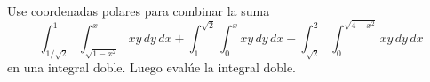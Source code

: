 \item Use coordenadas polares para combinar la suma
\[ \int_{1/\sqrt{2}}^1 \int_{\sqrt{1-x^2}}^x xy \, dy \, dx + \int_1^{\sqrt{2}} \int_0^x xy \, dy \, dx + \int_{\sqrt{2}}^2 \int_0^{\sqrt{4-x^2}} xy \, dy \, dx \]
en una integral doble. Luego evalúe la integral doble.
